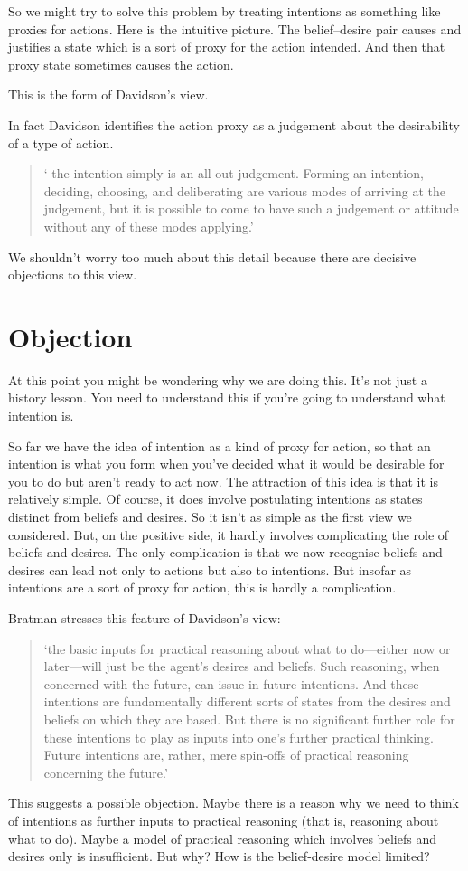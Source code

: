 \documentclass[12pt,\papersize]{extarticle}
\begin{document}
So we might try to solve this problem by treating intentions as  something like proxies for actions. 
Here is the intuitive picture.
The belief--desire pair causes and justifies a state which is a sort of proxy for the action intended. 
And then that proxy state sometimes causes the action.

This is the form of Davidson's view.

In fact Davidson identifies the action proxy as a judgement about the desirability of a type of action. 
%
\begin{quote}
`%
the intention simply is an all-out judgement. Forming an intention, deciding, choosing, and deliberating are various modes of arriving at the judgement, but it is possible to come to have such a judgement or attitude without any of these modes applying.' \citep[p.\ 99]{Davidson:1978hy}
\end{quote}
%
We shouldn't worry too much about this detail because there are decisive objections to this view.


\section{Objection}
At this point you might be wondering why we are doing this.
It's not just a history lesson.
You need to understand this if you're going to understand what intention is.

So far we have the idea of intention as a kind of proxy for action, so that an intention is what you form when you've decided what it would be desirable for you to do but aren't ready to act now.
The attraction of this idea is that it is relatively simple.
Of course, it does involve postulating intentions as states distinct from beliefs and desires.
So it isn't as simple as the first view we considered.
But, on the positive side, it hardly involves complicating the role of beliefs and desires.
The only complication is that we now recognise beliefs and desires can lead not only to actions but also to intentions.
But insofar as intentions are a sort of proxy for action, this is hardly a complication.

Bratman stresses this feature of Davidson's view:
%
\begin{quote}
`the basic inputs for practical reasoning about what to do---either now or later---will just be the agent's desires and beliefs. 
Such reasoning, when concerned with the future, can issue in future intentions. 
And these intentions are fundamentally different sorts of states from the desires and beliefs on which they are based. 
But there is no significant further role for these intentions to play as inputs into one's further practical thinking. 
Future intentions are, rather, mere spin-offs of practical reasoning concerning the future.' \citep[p.\ 222]{Bratman:1985fk} %
\end{quote}
%
This suggests a possible objection.
Maybe there is a reason why we need to think of intentions as further inputs to practical reasoning (that is, reasoning about what to do).
Maybe a model of practical reasoning which involves beliefs and desires only is insufficient.
But why?
How is the belief-desire model limited?
\end{document}
